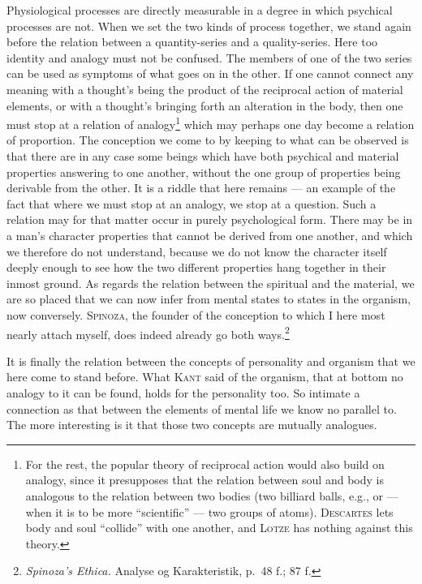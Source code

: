 \documentclass[12pt]{book}
\newcommand{\opage}[1]{\marginnote{\footnotesize\textit{[#1]}}}
\begin{document}
Physiological processes are directly measurable in a degree in which psychical
processes are not. When we set the two kinds of process together, we stand again
before the relation between a quantity-series and a quality-series. Here too
identity and analogy must not be confused. The members of one of the two series
can be used as symptoms of what goes on in the other. If one cannot connect any
meaning with a thought's being the \opage{116}product of the reciprocal action of material
elements, or with a thought's bringing forth an alteration in the body, then one
must stop at a relation of analogy\footnote{For the rest, the popular theory of
reciprocal action would also build on analogy, since it presupposes that the
relation between soul and body is analogous to the relation between two bodies
(two billiard balls, e.g., or --- when it is to be more ``scientific'' --- two
groups of atoms). \textsc{Descartes} lets body and soul ``collide'' with one
another, and \textsc{Lotze} has nothing against this theory.} which may perhaps
one day become a relation of proportion. The conception we come to by keeping to
what can be observed is that there are in any case some beings which have both
psychical and material properties answering to one another, without the one group
of properties being derivable from the other. It is a riddle that here remains ---
an example of the fact that where we must stop at an analogy, we stop at a
question. Such a relation may for that matter occur in purely psychological form.
There may be in a man's character properties that cannot be derived from one
another, and which we therefore do not understand, because we do not know the
character itself deeply enough to see how the two different properties hang
together in their inmost ground. As regards the relation between the spiritual and
the material, we are so placed that we can now infer from mental states to states
in the organism, now conversely. \textsc{Spinoza}, the founder of the conception
to which I here most nearly attach myself, does indeed already go both
ways.\footnote{\textit{Spinoza's Ethica.} Analyse og Karakteristik, p.\ 48 f.;
87 f.}

It is finally the relation between the concepts of personality and organism that
we here come to stand before. What \textsc{Kant} said of the organism, that at
bottom no analogy to it can be found, holds for the personality too. \opage{117}So intimate a
connection as that between the elements of mental life we know no parallel to. The
more interesting is it that those two concepts are mutually analogues.
\end{document}
